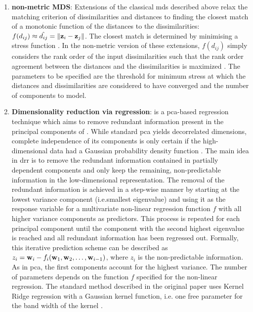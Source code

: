 \begin{enumerate}
\item\textbf{non-metric MDS}: Extensions of the classical \gls{mds} described above relax the matching criterion of dissimilarities and distances to finding the closest match of a monotonic function of the distances to the dissimilarities: \(f(d_{ij}) \approx \hat{d_{ij}} = \lVert \boldsymbol{\mathbf{z}}_{i} - \boldsymbol{\mathbf{z}}_{j}\rVert \). The closest match is determined by minimising a stress function \citep{Kruskal1964a,Kruskal1964b}. In the non-metric version of these extensions, \(f(d_{ij})\) simply considers the rank order of the input dissimilarities such that the rank order agreement between the distances and the dissimilarities is maximized \citep{Minchin1987}. The parameters to be specified are the threshold for minimum stress at which the distances and dissimilarities are considered to have converged and the number of components to model.

\item\textbf{Dimensionality reduction via regression}:  is a \gls{pca}-based regression technique which aims to remove redundant information present in the principal components  of . While standard \gls{pca} yields decorrelated dimensions, complete independence of its components is only certain if the high-dimensional data had a Gaussian probability density function \citep{Laparra2015}. The main idea in \gls{drr} is to remove the redundant information contained in partially dependent components and only keep the remaining, non-predictable information in the low-dimensional representation. The removal of the redundant information is achieved in a step-wise manner by starting at the lowest variance component (i.e.smallest eigenvalue) and using it as the response variable for a multivariate non-linear regression function \(f\) with all higher variance components as predictors. This process is repeated for each principal component until the component with the second highest eigenvalue is reached and all redundant information has been regressed out.  Formally, this iterative prediction scheme can be described as \(z_i = \boldsymbol{\mathbf{w}}_{i} - f_i(\boldsymbol{\mathbf{w}}_{1},\boldsymbol{\mathbf{w}}_{2}, \dots ,\allowbreak \boldsymbol{\mathbf{w}}_{ i-1})\), where \(z_i\) is the non-predictable information. As in \gls{pca}, the first components account for the highest variance. The number of parameters depends on the function \(f\) specified for the non-linear regression. The standard method described in the original paper uses Kernel Ridge regression with a Gaussian kernel function, i.e. one free parameter for the band width of the kernel \citep{Laparra2015}. 


\end{enumerate}
